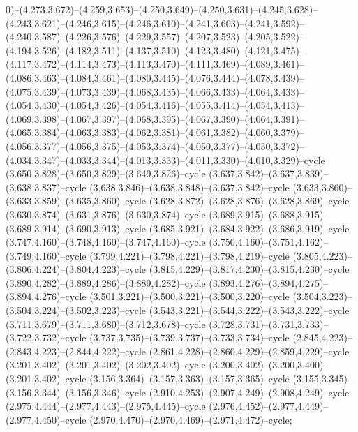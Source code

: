 0)--(4.273,3.672)--(4.259,3.653)--(4.250,3.649)--(4.250,3.631)--(4.245,3.628)--(4.243,3.621)--(4.246,3.615)--(4.246,3.610)--(4.241,3.603)--(4.241,3.592)--(4.240,3.587)--(4.226,3.576)--(4.229,3.557)--(4.207,3.523)--(4.205,3.522)--(4.194,3.526)--(4.182,3.511)--(4.137,3.510)--(4.123,3.480)--(4.121,3.475)--(4.117,3.472)--(4.114,3.473)--(4.113,3.470)--(4.111,3.469)--(4.089,3.461)--(4.086,3.463)--(4.084,3.461)--(4.080,3.445)--(4.076,3.444)--(4.078,3.439)--(4.075,3.439)--(4.073,3.439)--(4.068,3.435)--(4.066,3.433)--(4.064,3.433)--(4.054,3.430)--(4.054,3.426)--(4.054,3.416)--(4.055,3.414)--(4.054,3.413)--(4.069,3.398)--(4.067,3.397)--(4.068,3.395)--(4.067,3.390)--(4.064,3.391)--(4.065,3.384)--(4.063,3.383)--(4.062,3.381)--(4.061,3.382)--(4.060,3.379)--(4.056,3.377)--(4.056,3.375)--(4.053,3.374)--(4.050,3.377)--(4.050,3.372)--(4.034,3.347)--(4.033,3.344)--(4.013,3.333)--(4.011,3.330)--(4.010,3.329)--cycle (3.650,3.828)--(3.650,3.829)--(3.649,3.826)--cycle (3.637,3.842)--(3.637,3.839)--(3.638,3.837)--cycle (3.638,3.846)--(3.638,3.848)--(3.637,3.842)--cycle (3.633,3.860)--(3.633,3.859)--(3.635,3.860)--cycle (3.628,3.872)--(3.628,3.876)--(3.628,3.869)--cycle (3.630,3.874)--(3.631,3.876)--(3.630,3.874)--cycle (3.689,3.915)--(3.688,3.915)--(3.689,3.914)--(3.690,3.913)--cycle (3.685,3.921)--(3.684,3.922)--(3.686,3.919)--cycle (3.747,4.160)--(3.748,4.160)--(3.747,4.160)--cycle (3.750,4.160)--(3.751,4.162)--(3.749,4.160)--cycle (3.799,4.221)--(3.798,4.221)--(3.798,4.219)--cycle (3.805,4.223)--(3.806,4.224)--(3.804,4.223)--cycle (3.815,4.229)--(3.817,4.230)--(3.815,4.230)--cycle (3.890,4.282)--(3.889,4.286)--(3.889,4.282)--cycle (3.893,4.276)--(3.894,4.275)--(3.894,4.276)--cycle (3.501,3.221)--(3.500,3.221)--(3.500,3.220)--cycle (3.504,3.223)--(3.504,3.224)--(3.502,3.223)--cycle (3.543,3.221)--(3.544,3.222)--(3.543,3.222)--cycle (3.711,3.679)--(3.711,3.680)--(3.712,3.678)--cycle (3.728,3.731)--(3.731,3.733)--(3.722,3.732)--cycle (3.737,3.735)--(3.739,3.737)--(3.733,3.734)--cycle (2.845,4.223)--(2.843,4.223)--(2.844,4.222)--cycle (2.861,4.228)--(2.860,4.229)--(2.859,4.229)--cycle (3.201,3.402)--(3.201,3.402)--(3.202,3.402)--cycle (3.200,3.402)--(3.200,3.400)--(3.201,3.402)--cycle (3.156,3.364)--(3.157,3.363)--(3.157,3.365)--cycle (3.155,3.345)--(3.156,3.344)--(3.156,3.346)--cycle (2.910,4.253)--(2.907,4.249)--(2.908,4.249)--cycle (2.975,4.444)--(2.977,4.443)--(2.975,4.445)--cycle (2.976,4.452)--(2.977,4.449)--(2.977,4.450)--cycle (2.970,4.470)--(2.970,4.469)--(2.971,4.472)--cycle;
